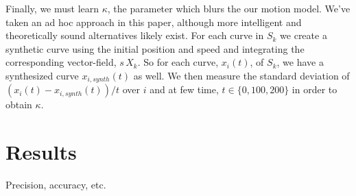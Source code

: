 \documentclass[conference]{IEEEtran}
\begin{document}
  Finally, we must learn $\kappa$, the parameter which blurs the our motion model.
  We've taken an ad hoc approach in this paper, although more intelligent and theoretically sound alternatives likely exist.
  For each curve in $S_k$ we create a synthetic curve using the initial position and speed and integrating the corresponding vector-field, $s\, X_k$.
  So for each curve, $x_i(t)$, of $S_k$, we have a synthesized curve $x_{i,synth}(t)$ as well.
  We then measure the standard deviation of $(x_i(t) - x_{i,synth}(t)) / t$ over $i$ and at few time, $t \in \{ 0, 100, 200 \}$ in order to obtain $\kappa$.
  

%  
  
\section{Results}

 Precision, accuracy, etc.
\end{document}
